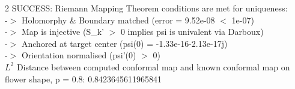 \begin{tiny}
\begin{multicols}{2}
SUCCESS: Riemann Mapping Theorem conditions are met for uniqueness: \\
  -$>$ Holomorphy \& Boundary matched (error = 9.52e-08 $<$ 1e-07) \\
  -$>$ Map is injective (S\_k' $>$ 0 implies psi is univalent via Darboux) \\
  -$>$ Anchored at target center (psi(0) = -1.33e-16-2.13e-17j) \\
  -$>$ Orientation normalised (psi'(0) $>$ 0) \\
$L^2$ Distance between computed conformal map and known conformal map on flower shape, p = 0.8: 0.8423645611965841
\end{multicols}
\end{tiny}

\newpage
